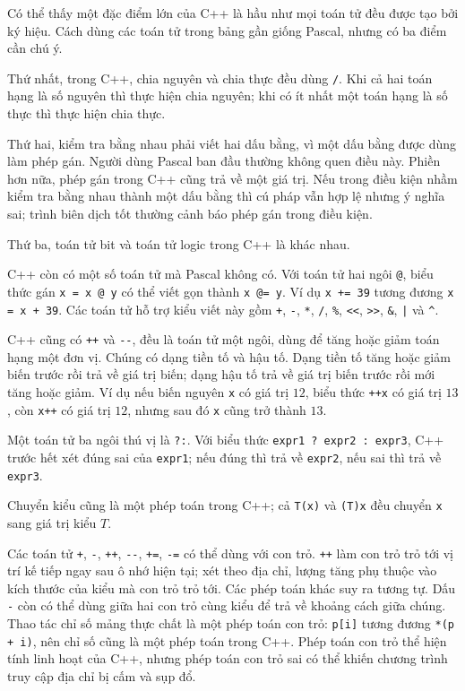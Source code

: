 \documentclass[11pt]{article}
\newcommand{\cpp}{C++}
\newcommand{\pascal}{Pascal}
\begin{document}
Có thể thấy một đặc điểm lớn của \cpp{} là hầu như mọi toán tử đều được tạo
bởi ký hiệu. Cách dùng các toán tử trong bảng gần giống \pascal{}, nhưng có
ba điểm cần chú ý.

Thứ nhất, trong \cpp{}, chia nguyên và chia thực đều dùng \verb|/|. Khi cả
hai toán hạng là số nguyên thì thực hiện chia nguyên; khi có ít nhất một toán
hạng là số thực thì thực hiện chia thực.

Thứ hai, kiểm tra bằng nhau phải viết hai dấu bằng, vì một dấu bằng được dùng
làm phép gán. Người dùng \pascal{} ban đầu thường không quen điều này. Phiền
hơn nữa, phép gán trong \cpp{} cũng trả về một giá trị. Nếu trong điều kiện
nhầm kiểm tra bằng nhau thành một dấu bằng thì cú pháp vẫn hợp lệ nhưng ý
nghĩa sai; trình biên dịch tốt thường cảnh báo phép gán trong điều kiện.

Thứ ba, toán tử bit và toán tử logic trong \cpp{} là khác nhau.

\cpp{} còn có một số toán tử mà \pascal{} không có. Với toán tử hai ngôi
\verb|@|, biểu thức gán \verb|x = x @ y| có thể viết gọn thành
\verb|x @= y|. Ví dụ \verb|x += 39| tương đương \verb|x = x + 39|. Các toán
tử hỗ trợ kiểu viết này gồm \verb|+|, \verb|-|, \verb|*|, \verb|/|,
\verb|%|, \verb|<<|, \verb|>>|, \verb|&|, \verb"|" và \verb|^|.

\cpp{} cũng có \verb|++| và \verb|--|, đều là toán tử một ngôi, dùng để tăng
hoặc giảm toán hạng một đơn vị. Chúng có dạng tiền tố và hậu tố. Dạng tiền tố
tăng hoặc giảm biến trước rồi trả về giá trị biến; dạng hậu tố trả về giá trị
biến trước rồi mới tăng hoặc giảm. Ví dụ nếu biến nguyên \verb|x| có giá trị
\(12\), biểu thức \verb|++x| có giá trị \(13\), còn \verb|x++| có giá trị
\(12\), nhưng sau đó \verb|x| cũng trở thành \(13\).

Một toán tử ba ngôi thú vị là \verb|?:|. Với biểu thức
\verb|expr1 ? expr2 : expr3|, \cpp{} trước hết xét đúng sai của
\verb|expr1|; nếu đúng thì trả về \verb|expr2|, nếu sai thì trả về
\verb|expr3|.

Chuyển kiểu cũng là một phép toán trong \cpp{}; cả \verb|T(x)| và \verb|(T)x|
đều chuyển \verb|x| sang giá trị kiểu \(T\).

Các toán tử \verb|+|, \verb|-|, \verb|++|, \verb|--|, \verb|+=|, \verb|-=|
có thể dùng với con trỏ. \verb|++| làm con trỏ trỏ tới vị trí kế tiếp ngay
sau ô nhớ hiện tại; xét theo địa chỉ, lượng tăng phụ thuộc vào kích thước của
kiểu mà con trỏ trỏ tới. Các phép toán khác suy ra tương tự. Dấu \verb|-|
còn có thể dùng giữa hai con trỏ cùng kiểu để trả về khoảng cách giữa chúng.
Thao tác chỉ số mảng thực chất là một phép toán con trỏ:
\verb|p[i]| tương đương \verb|*(p + i)|, nên chỉ số cũng là một phép toán
trong \cpp{}. Phép toán con trỏ thể hiện tính linh hoạt của \cpp{}, nhưng
phép toán con trỏ sai có thể khiến chương trình truy cập địa chỉ bị cấm và
sụp đổ.
\end{document}
